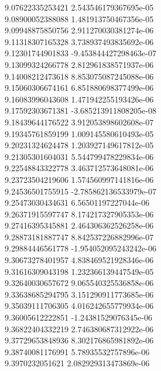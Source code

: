 {9.07622335253421 2.543546179367695e-05
 \\
9.08900052388088 1.481913750467356e-05
 \\
9.09948875850756 2.911270030381274e-06
 \\
9.11318307165328 3.738937493835692e-06
 \\
9.12301744901833 -9.453844427298463e-07
 \\
9.13099324266778 2.812961838571937e-06
 \\
9.14008212473618 8.853075087245088e-06
 \\
9.15060306674161 6.851880698377499e-06
 \\
9.16083996043608 1.471942255193426e-06
 \\
9.17592303671381 -3.685213911808205e-08
 \\
9.18439644176522 3.912053898602608e-07
 \\
9.19345761859199 1.009145580610493e-05
 \\
9.20231324624478 1.203927149617812e-05
 \\
9.21305301604031 5.544799478229834e-06
 \\
9.22548843322778 3.463712573648081e-06
 \\
9.23723504219606 1.574560997141816e-06
 \\
9.24536501755915 -2.785862136533979e-07
 \\
9.25473030434631 6.56501197227044e-06
 \\
9.26371915597747 8.174217327905353e-06
 \\
9.27416395345881 2.464306362526258e-06
 \\
9.28873181887747 8.842537226882996e-07
 \\
9.29884446561778 -1.954052095243242e-06
 \\
9.30673278401957 4.838469521928346e-06
 \\
9.31616309043198 1.232366139447549e-05
 \\
9.32640030657672 9.065540325536858e-06
 \\
9.33638685294795 3.151290911773685e-06
 \\
9.35039111706305 4.016242655779934e-06
 \\
9.36005612222851 -1.24381529076345e-06
 \\
9.36822404332219 2.746380687312922e-06
 \\
9.37729653848936 8.302176865981892e-06
 \\
9.38740081176991 5.78935532757896e-06
 \\
9.3970232051621 2.082929313473869e-06
}
